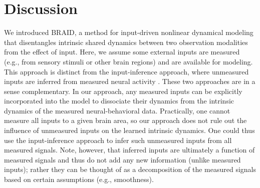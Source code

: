 \documentclass{article} %
\newcommand{\ourmethod}{BRAID}
\begin{document}
\section{Discussion}\label{sec: Discussion}

We introduced \ourmethod{}, a method for input-driven nonlinear dynamical modeling that disentangles intrinsic shared dynamics between two observation modalities from the effect of input. %
Here, we assume some external inputs are measured  (e.g., from sensory stimuli or other brain regions) and are available for modeling. This approach is distinct from the input-inference approach, where unmeasured inputs are inferred from measured neural activity \citep{pandarinath2018inferring, schimel2022ilqr}. These two approaches are in a sense complementary. In our approach, any measured inputs can be explicitly incorporated into the model to dissociate their dynamics from the intrinsic dynamics of the measured neural-behavioral data. Practically, one cannot measure all inputs to a given brain area, so our approach does not rule out the influence of unmeasured inputs on the learned intrinsic dynamics. One could thus use the input-inference approach to infer such unmeasured inputs from all measured signals. Note, however, that inferred inputs are ultimately a function of measured signals and thus do not add any new information (unlike measured inputs); rather they can be thought of as a decomposition of the measured signals based on certain assumptions (e.g., smoothness).
\end{document}
